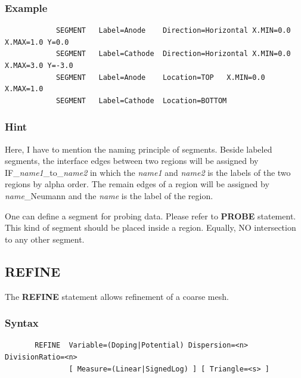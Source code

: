 \documentclass[11pt,pdftex]{article}
\begin{document}
\subsubsection*{Example}
\begin{verbatim}
            SEGMENT   Label=Anode    Direction=Horizontal X.MIN=0.0 X.MAX=1.0 Y=0.0
            SEGMENT   Label=Cathode  Direction=Horizontal X.MIN=0.0 X.MAX=3.0 Y=-3.0
            SEGMENT   Label=Anode    Location=TOP   X.MIN=0.0 X.MAX=1.0
            SEGMENT   Label=Cathode  Location=BOTTOM
\end{verbatim}

\subsubsection*{Hint}
Here, I have to mention the naming principle of segments. Beside
labeled segments, the interface edges between two regions will be
assigned by IF\_\textit{name1}\_to\_\textit{name2} in which the
\textit{name1} and \textit{name2} is the labels of the two regions
by alpha order. The remain edges of a region will be assigned by
\textit{name}\_Neumann and the \textit{name} is the label of the
region.

One can define a segment for probing data. Please refer to \textbf{PROBE} statement.
This kind of segment should be placed inside a region. Equally, NO intersection to any other segment.

\newpage
\subsection{REFINE}
The \textbf{REFINE} statement allows refinement of a coarse mesh.

\subsubsection*{Syntax}
\begin{verbatim}
       REFINE  Variable=(Doping|Potential) Dispersion=<n> DivisionRatio=<n>
               [ Measure=(Linear|SignedLog) ] [ Triangle=<s> ]
\end{verbatim}
\end{document}
